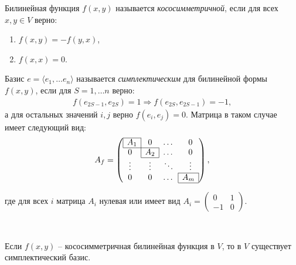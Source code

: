 \begin{reminder}
    Билинейная функция $f(x, y)$ называется \textit{кососимметричной}, если для всех $x, y \in V$ верно:
    \begin{enumerate}
        \item $f(x, y) = -f(y, x)$,
        \item $f(x, x) = 0$.
    \end{enumerate}
\end{reminder}

\begin{definition}
    Базис $e = \langle e_1, \dots e_n \rangle$ называется \textit{симплектическим} для билинейной формы $f(x, y)$, 
    если для $S = 1,\dots n$ верно:
    \begin{gather*}
        f(e_{2S - 1}, e_{2S}) = 1 \Rightarrow f(e_{2S}, e_{2S-1}) = -1,
    \end{gather*} а для остальных значений $i, j$ верно $f(e_i, e_j) = 0$. 
    Матрица в таком случае имеет следующий вид: 
    \[A_f = \left(\begin{array}{@{}cccc@{}}
        \cline{1-1}
        \multicolumn{1}{|c|}{A_1} & 0 & \dots & 0\\
        \cline{1-2}
        0 & \multicolumn{1}{|c|}{A_2} & \dots & 0\\
        \cline{2-2}
        \vdots & \vdots & \ddots & \vdots\\
        \cline{4-4}
        0 & 0 & \dots & \multicolumn{1}{|c|}{A_m}\\
        \cline{4-4}
    \end{array}\right),\]
    
    где для всех $i$ матрица $A_i$ нулевая или имеет вид $A_i = 
    \begin{pmatrix}
        0  &1 \\
        -1 &0
    \end{pmatrix}$.
\end{definition}

\begin{theorem}~

    Если $f(x, y)$ -- кососимметричная билинейная функция в $V$, то в $V$ существует симплектический базис.
\end{theorem}

